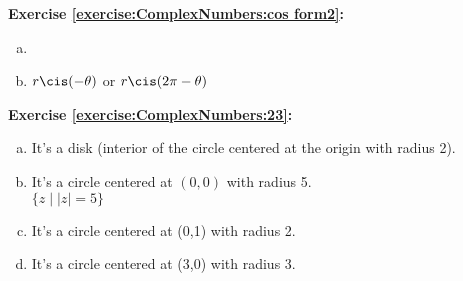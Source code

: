 \noindent\textbf{Exercise \ref{exercise:ComplexNumbers:cos form2}:}
\begin{enumerate}[(a)]
\item

\item
$r\cis(-\theta)$ or $r\cis(2\pi-\theta)$
\end{enumerate}

\noindent\textbf{Exercise \ref{exercise:ComplexNumbers:23}:}  %
\begin{enumerate}[(a)]
\item
It's a disk (interior of the circle centered at the origin with radius 2).
\begin{figure}[H]
\begin{center}
\end{center}
\end{figure}

\item
It's a circle centered at $(0,0)$ with radius 5.\\
$\{z \mid |z| = 5\}$

\item
It's a circle centered at (0,1) with radius 2.

\item
It's a circle centered at (3,0) with radius 3.
\end{enumerate}

